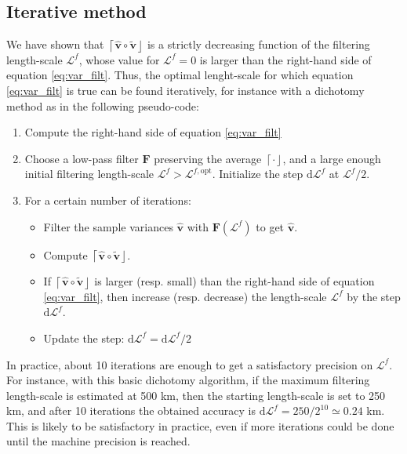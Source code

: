 \documentclass[12pt]{scrartcl}
\begin{document}
\subsection{Iterative method}
We have shown that $\left\lceil\widehat{\mathbf{v}} \circ \widetilde{\mathbf{v}}\right\rfloor$ is a strictly decreasing function of the filtering length-scale $\mathcal{L}^f$, whose value for $\mathcal{L}^f = 0$ is larger than the right-hand side of equation \eqref{eq:var_filt}. Thus, the optimal lenght-scale for which equation \eqref{eq:var_filt} is true can be found iteratively, for instance with a dichotomy method as in the following pseudo-code:
\begin{enumerate}
\item Compute the right-hand side of equation \eqref{eq:var_filt}
\item Choose a low-pass filter $\mathbf{F}$ preserving the average $\left\lceil \cdot \right\rfloor$, and a large enough initial filtering length-scale $\mathcal{L}^f > \mathcal{L}^{f,\mathrm{opt}}$. Initialize the step $\mathrm{d}\mathcal{L}^f$ at $\mathcal{L}^f/2$.
\item For a certain number of iterations:
\begin{itemize}
\item Filter the sample variances $\widehat{\mathbf{v}}$ with $\mathbf{F}\left(\mathcal{L}^f\right)$ to get $\widehat{\mathbf{v}}$.
\item Compute $\left\lceil\widehat{\mathbf{v}} \circ \widetilde{\mathbf{v}}\right\rfloor$.
\item If $\left\lceil\widehat{\mathbf{v}} \circ \widetilde{\mathbf{v}}\right\rfloor$ is larger (resp. small) than the right-hand side of equation \eqref{eq:var_filt}, then increase (resp. decrease) the length-scale $\mathcal{L}^f$ by the step $\mathrm{d}\mathcal{L}^f$.
\item Update the step: $\mathrm{d}\mathcal{L}^f = \mathrm{d}\mathcal{L}^f/2$
\end{itemize}
\end{enumerate}
In practice, about 10 iterations are enough to get a satisfactory precision on $\mathcal{L}^f$. For instance, with this basic dichotomy algorithm, if the maximum filtering length-scale is estimated at 500 km, then the starting length-scale is set to 250 km, and after 10 iterations the obtained accuracy is $\mathrm{d}\mathcal{L}^f = 250/2^{10} \simeq 0.24$ km. This is likely to be satisfactory in practice, even if more iterations could be done until the machine precision is reached.
\end{document}
